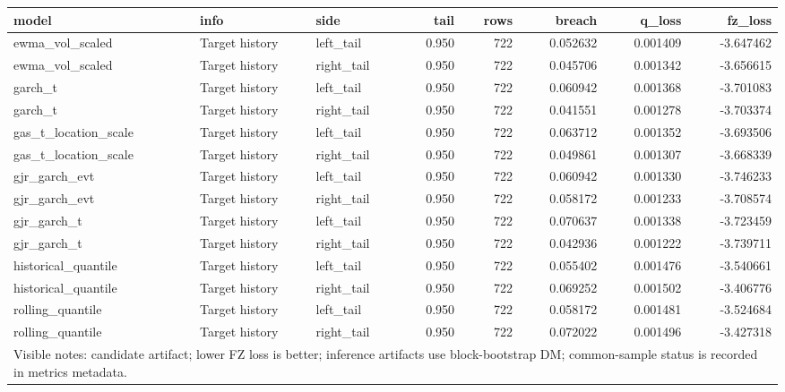 \begin{tabular}{lllrrrrr}
\toprule
model & info & side & tail & rows & breach & q_loss & fz_loss \\
\midrule
ewma\_vol\_scaled & Target history & left\_tail & 0.950 & 722 & 0.052632 & 0.001409 & -3.647462 \\
ewma\_vol\_scaled & Target history & right\_tail & 0.950 & 722 & 0.045706 & 0.001342 & -3.656615 \\
garch\_t & Target history & left\_tail & 0.950 & 722 & 0.060942 & 0.001368 & -3.701083 \\
garch\_t & Target history & right\_tail & 0.950 & 722 & 0.041551 & 0.001278 & -3.703374 \\
gas\_t\_location\_scale & Target history & left\_tail & 0.950 & 722 & 0.063712 & 0.001352 & -3.693506 \\
gas\_t\_location\_scale & Target history & right\_tail & 0.950 & 722 & 0.049861 & 0.001307 & -3.668339 \\
gjr\_garch\_evt & Target history & left\_tail & 0.950 & 722 & 0.060942 & 0.001330 & -3.746233 \\
gjr\_garch\_evt & Target history & right\_tail & 0.950 & 722 & 0.058172 & 0.001233 & -3.708574 \\
gjr\_garch\_t & Target history & left\_tail & 0.950 & 722 & 0.070637 & 0.001338 & -3.723459 \\
gjr\_garch\_t & Target history & right\_tail & 0.950 & 722 & 0.042936 & 0.001222 & -3.739711 \\
historical\_quantile & Target history & left\_tail & 0.950 & 722 & 0.055402 & 0.001476 & -3.540661 \\
historical\_quantile & Target history & right\_tail & 0.950 & 722 & 0.069252 & 0.001502 & -3.406776 \\
rolling\_quantile & Target history & left\_tail & 0.950 & 722 & 0.058172 & 0.001481 & -3.524684 \\
rolling\_quantile & Target history & right\_tail & 0.950 & 722 & 0.072022 & 0.001496 & -3.427318 \\
\midrule
\multicolumn{8}{l}{\footnotesize Visible notes: candidate artifact; lower FZ loss is better; inference artifacts use block-bootstrap DM; common-sample status is recorded in metrics metadata.} \\
\bottomrule
\end{tabular}
